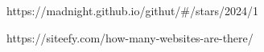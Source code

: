\renewcommand{\section}[2]{\anonsection{Библиографический список}}




\label{sec:bibliography}

https://madnight.github.io/githut/\#/stars/2024/1

https://siteefy.com/how-many-websites-are-there/






\clearpage